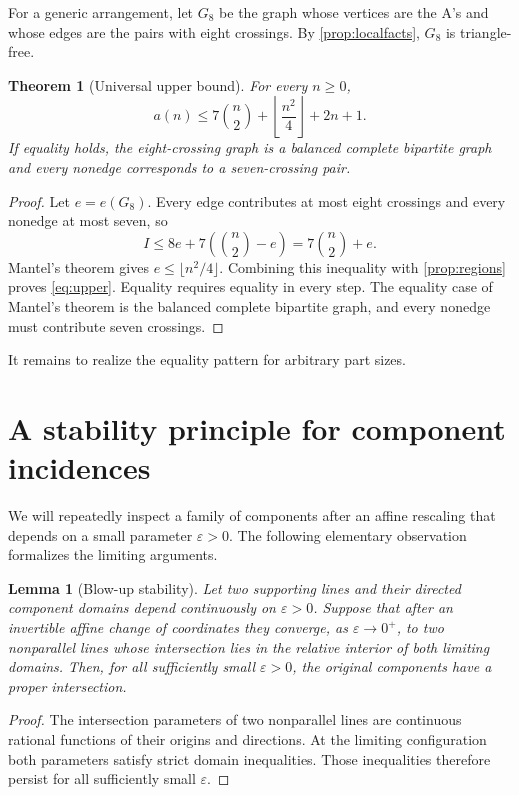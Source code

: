 \documentclass[11pt]{amsart}
\newtheorem{theorem}{Theorem}[section]
\newtheorem{lemma}[lemma]{Lemma}
\theoremstyle{definition}
\newcommand{\eps}{\varepsilon}
\begin{document}
For a generic arrangement, let $G_8$ be the graph whose vertices are the A's
and whose edges are the pairs with eight crossings.  By
\cref{prop:localfacts}, $G_8$ is triangle-free.

\begin{theorem}[Universal upper bound]\label{thm:upper}
For every $n\ge0$,
\begin{equation}\label{eq:upper}
 a(n)\le 7\binom n2+\left\lfloor\frac{n^2}{4}\right\rfloor+2n+1.
\end{equation}
If equality holds, the eight-crossing graph is a balanced complete bipartite
graph and every nonedge corresponds to a seven-crossing pair.
\end{theorem}

\begin{proof}
Let $e=e(G_8)$.  Every edge contributes at most eight crossings and every
nonedge at most seven, so
\[
 I\le 8e+7\left(\binom n2-e\right)=7\binom n2+e.
\]
Mantel's theorem \cite{Mantel1907} gives
$e\le\lfloor n^2/4\rfloor$.  Combining this inequality with
\cref{prop:regions} proves \eqref{eq:upper}.  Equality requires equality in
every step.  The equality case of Mantel's theorem is the balanced complete
bipartite graph, and every nonedge must contribute seven crossings.
\end{proof}

It remains to realize the equality pattern for arbitrary part sizes.

\section{A stability principle for component incidences}

We will repeatedly inspect a family of components after an affine rescaling
that depends on a small parameter $\eps>0$.  The following elementary
observation formalizes the limiting arguments.

\begin{lemma}[Blow-up stability]\label{lem:stability}
Let two supporting lines and their directed component domains depend
continuously on $\eps>0$.  Suppose that after an invertible affine change of
coordinates they converge, as $\eps\to0^+$, to two nonparallel lines whose
intersection lies in the relative interior of both limiting domains.  Then,
for all sufficiently small $\eps>0$, the original components have a proper
intersection.
\end{lemma}

\begin{proof}
The intersection parameters of two nonparallel lines are continuous
rational functions of their origins and directions.  At the limiting
configuration both parameters satisfy strict domain inequalities.  Those
inequalities therefore persist for all sufficiently small $\eps$.
\end{proof}
\end{document}
